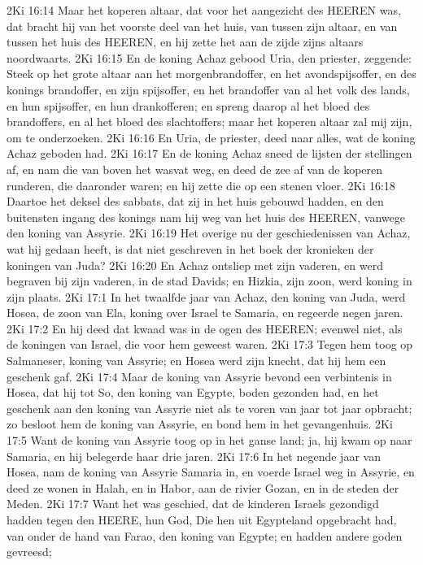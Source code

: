 2Ki 16:14  Maar het koperen altaar, dat voor het aangezicht des HEEREN was, dat bracht hij van het voorste deel van het huis, van tussen zijn altaar, en van tussen het huis des HEEREN, en hij zette het aan de zijde zijns altaars noordwaarts.
2Ki 16:15  En de koning Achaz gebood Uria, den priester, zeggende: Steek op het grote altaar aan het morgenbrandoffer, en het avondspijsoffer, en des konings brandoffer, en zijn spijsoffer, en het brandoffer van al het volk des lands, en hun spijsoffer, en hun drankofferen; en spreng daarop al het bloed des brandoffers, en al het bloed des slachtoffers; maar het koperen altaar zal mij zijn, om te onderzoeken.
2Ki 16:16  En Uria, de priester, deed naar alles, wat de koning Achaz geboden had.
2Ki 16:17  En de koning Achaz sneed de lijsten der stellingen af, en nam die van boven het wasvat weg, en deed de zee af van de koperen runderen, die daaronder waren; en hij zette die op een stenen vloer.
2Ki 16:18  Daartoe het deksel des sabbats, dat zij in het huis gebouwd hadden, en den buitensten ingang des konings nam hij weg van het huis des HEEREN, vanwege den koning van Assyrie.
2Ki 16:19  Het overige nu der geschiedenissen van Achaz, wat hij gedaan heeft, is dat niet geschreven in het boek der kronieken der koningen van Juda?
2Ki 16:20  En Achaz ontsliep met zijn vaderen, en werd begraven bij zijn vaderen, in de stad Davids; en Hizkia, zijn zoon, werd koning in zijn plaats.
2Ki 17:1  In het twaalfde jaar van Achaz, den koning van Juda, werd Hosea, de zoon van Ela, koning over Israel te Samaria, en regeerde negen jaren.
2Ki 17:2  En hij deed dat kwaad was in de ogen des HEEREN; evenwel niet, als de koningen van Israel, die voor hem geweest waren.
2Ki 17:3  Tegen hem toog op Salmaneser, koning van Assyrie; en Hosea werd zijn knecht, dat hij hem een geschenk gaf.
2Ki 17:4  Maar de koning van Assyrie bevond een verbintenis in Hosea, dat hij tot So, den koning van Egypte, boden gezonden had, en het geschenk aan den koning van Assyrie niet als te voren van jaar tot jaar opbracht; zo besloot hem de koning van Assyrie, en bond hem in het gevangenhuis.
2Ki 17:5  Want de koning van Assyrie toog op in het ganse land; ja, hij kwam op naar Samaria, en hij belegerde haar drie jaren.
2Ki 17:6  In het negende jaar van Hosea, nam de koning van Assyrie Samaria in, en voerde Israel weg in Assyrie, en deed ze wonen in Halah, en in Habor, aan de rivier Gozan, en in de steden der Meden.
2Ki 17:7  Want het was geschied, dat de kinderen Israels gezondigd hadden tegen den HEERE, hun God, Die hen uit Egypteland opgebracht had, van onder de hand van Farao, den koning van Egypte; en hadden andere goden gevreesd;
